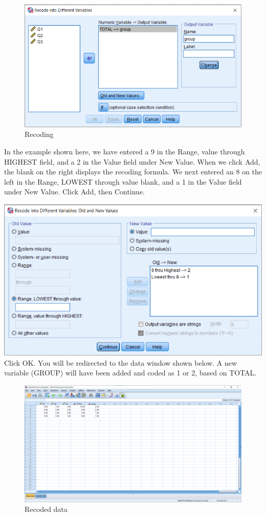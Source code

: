 \documentclass[
]{book}
\begin{document}
\begin{figure}
\centering
\includegraphics{Recode3.png}
\caption{Recoding}
\end{figure}

In the example shown here, we have entered a 9 in the Range, value through HIGHEST field, and a 2 in the Value field under New Value. When we click Add, the blank on the right displays the recoding formula. We next entered an 8 on the left in the Range, LOWEST through value blank, and a 1 in the Value field under New Value. Click Add, then Continue.

\includegraphics{Recode4.png}
Click OK. You will be redirected to the data window shown below. A new variable (GROUP) will have been added and coded as 1 or 2, based on TOTAL.

\begin{figure}
\centering
\includegraphics{RecodeData1.png}
\caption{Recoded data}
\end{figure}
\end{document}
